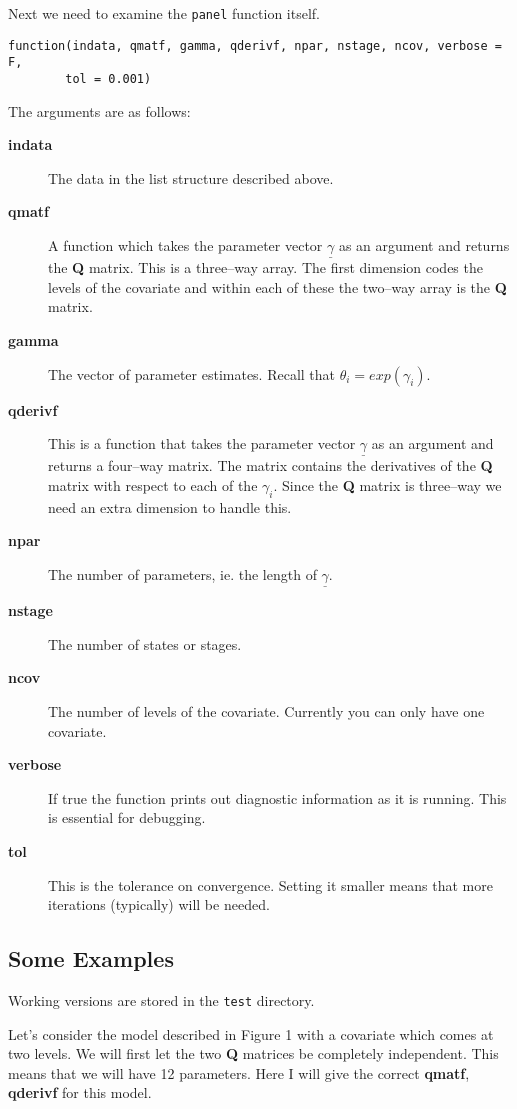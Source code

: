 \documentclass[12pt]{article}
\begin{document}
Next we need to examine the \verb+panel+ function itself.
\begin{verbatim}
function(indata, qmatf, gamma, qderivf, npar, nstage, ncov, verbose = F, 
        tol = 0.001)
\end{verbatim}
The arguments are as follows:
\begin{description}
\item[{\bf indata}]
The data in the list structure described above.
\item[{\bf qmatf}]
A function which takes the parameter vector $\underline{\gamma}$
as an argument and returns the {\bf Q} matrix.
This is a three--way array.
The first dimension codes the levels of the covariate and 
within each of these the two--way array is the {\bf Q} matrix.
\item[{\bf gamma}]
The vector of parameter estimates. Recall that $\theta_i=exp(\gamma_i)$.
\item[{\bf qderivf}]
This is a function that takes the parameter vector $\underline{\gamma}$
as an argument and returns a four--way matrix.
The matrix contains the derivatives of the {\bf Q} matrix with respect
to each of the $\gamma_i$.
Since the {\bf Q} matrix is three--way we need an extra dimension to handle
this.
\item[{\bf npar}]
The number of parameters, ie. the length of $\underline{\gamma}$.
\item[{\bf nstage}]
The number of states or stages.
\item[{\bf ncov}]
The number of levels of the covariate.
Currently you can only have one covariate.
\item[{\bf verbose}]
If true the function prints out diagnostic information as it is running.
This is essential for debugging.
\item[{\bf tol}]
This is the tolerance on convergence.
Setting it smaller means that more iterations (typically) will be
needed.
\end{description}

\subsection{Some Examples}

Working versions are stored in the {\tt test} directory.

Let's consider the model described in Figure 1 with a covariate which 
comes at two levels.
We will first let the two {\bf Q} matrices be completely independent.
This means that we will have 12 parameters.
Here I will give the correct {\bf qmatf}, {\bf qderivf} for this model.
\end{document}
